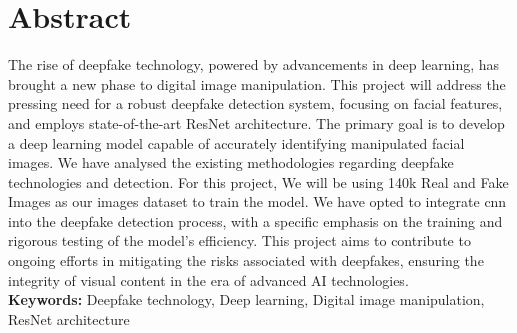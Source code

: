 \chapter*{Abstract}
The rise of deepfake technology, powered by advancements in deep learning, has brought a new phase to digital image manipulation. This project will address the pressing need for a robust deepfake detection system, focusing on facial features, and employs state-of-the-art ResNet architecture. The primary goal is to develop a deep learning model capable of accurately identifying manipulated facial images. We have analysed the existing methodologies regarding deepfake technologies and detection. For this project, We will be using 140k Real and Fake Images as our images dataset to  train the model. We have opted to integrate \acrshort*{cnn} into the deepfake detection process, with a specific emphasis on the training and rigorous testing of the model's efficiency. This project aims to contribute to ongoing efforts in mitigating the risks associated with deepfakes, ensuring the integrity of visual content in the era of advanced AI technologies.\\


\textbf{Keywords: }Deepfake technology, Deep learning, Digital image manipulation, ResNet architecture



